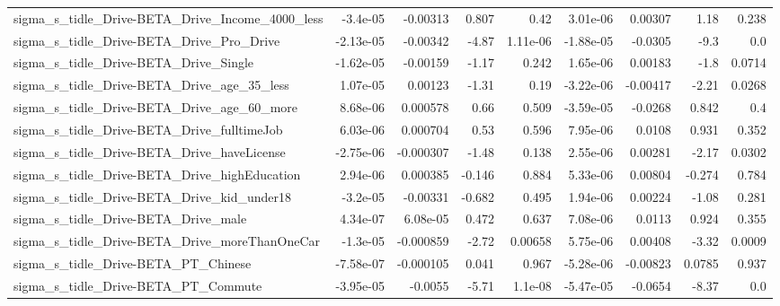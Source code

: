 \begin{tabular}{lrrrrrrrr}
sigma\_s\_tidle\_Drive-BETA\_Drive\_Income\_4000\_less    &    -3.4e-05 &     -0.00313 &     0.807 &     0.42 &   3.01e-06 &     0.00307 &         1.18 &         0.238 \\
sigma\_s\_tidle\_Drive-BETA\_Drive\_Pro\_Drive           &   -2.13e-05 &     -0.00342 &     -4.87 & 1.11e-06 &  -1.88e-05 &     -0.0305 &         -9.3 &           0.0 \\
sigma\_s\_tidle\_Drive-BETA\_Drive\_Single              &   -1.62e-05 &     -0.00159 &     -1.17 &    0.242 &   1.65e-06 &     0.00183 &         -1.8 &        0.0714 \\
sigma\_s\_tidle\_Drive-BETA\_Drive\_age\_35\_less         &    1.07e-05 &      0.00123 &     -1.31 &     0.19 &  -3.22e-06 &    -0.00417 &        -2.21 &        0.0268 \\
sigma\_s\_tidle\_Drive-BETA\_Drive\_age\_60\_more         &    8.68e-06 &     0.000578 &      0.66 &    0.509 &  -3.59e-05 &     -0.0268 &        0.842 &           0.4 \\
sigma\_s\_tidle\_Drive-BETA\_Drive\_fulltimeJob         &    6.03e-06 &     0.000704 &      0.53 &    0.596 &   7.95e-06 &      0.0108 &        0.931 &         0.352 \\
sigma\_s\_tidle\_Drive-BETA\_Drive\_haveLicense         &   -2.75e-06 &    -0.000307 &     -1.48 &    0.138 &   2.55e-06 &     0.00281 &        -2.17 &        0.0302 \\
sigma\_s\_tidle\_Drive-BETA\_Drive\_highEducation       &    2.94e-06 &     0.000385 &    -0.146 &    0.884 &   5.33e-06 &     0.00804 &       -0.274 &         0.784 \\
sigma\_s\_tidle\_Drive-BETA\_Drive\_kid\_under18         &    -3.2e-05 &     -0.00331 &    -0.682 &    0.495 &   1.94e-06 &     0.00224 &        -1.08 &         0.281 \\
sigma\_s\_tidle\_Drive-BETA\_Drive\_male                &    4.34e-07 &     6.08e-05 &     0.472 &    0.637 &   7.08e-06 &      0.0113 &        0.924 &         0.355 \\
sigma\_s\_tidle\_Drive-BETA\_Drive\_moreThanOneCar      &    -1.3e-05 &    -0.000859 &     -2.72 &  0.00658 &   5.75e-06 &     0.00408 &        -3.32 &        0.0009 \\
sigma\_s\_tidle\_Drive-BETA\_PT\_Chinese                &   -7.58e-07 &    -0.000105 &     0.041 &    0.967 &  -5.28e-06 &    -0.00823 &       0.0785 &         0.937 \\
sigma\_s\_tidle\_Drive-BETA\_PT\_Commute                &   -3.95e-05 &      -0.0055 &     -5.71 &  1.1e-08 &  -5.47e-05 &     -0.0654 &        -8.37 &           0.0 \\

\end{tabular}
